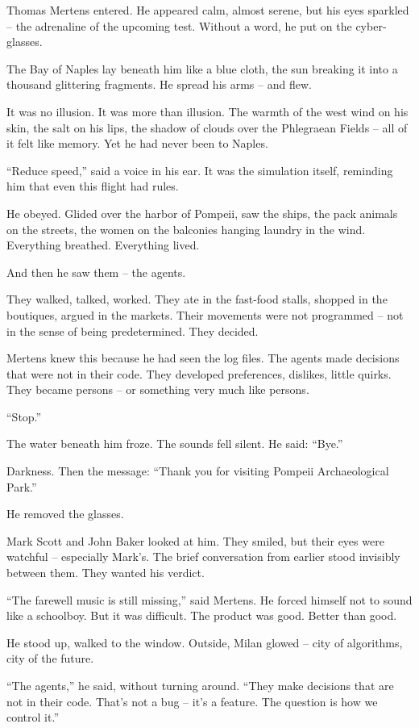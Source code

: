 \documentclass[
]{article}
\begin{document}
Thomas Mertens entered. He appeared calm, almost serene, but his eyes sparkled -- the adrenaline of the upcoming test. Without a word, he put on the cyber-glasses.

The Bay of Naples lay beneath him like a blue cloth, the sun breaking it into a thousand glittering fragments. He spread his arms -- and flew.

It was no illusion. It was more than illusion. The warmth of the west wind on his skin, the salt on his lips, the shadow of clouds over the Phlegraean Fields -- all of it felt like memory. Yet he had never been to Naples.

\enquote{Reduce speed,} said a voice in his ear. It was the simulation itself, reminding him that even this flight had rules.

He obeyed. Glided over the harbor of Pompeii, saw the ships, the pack animals on the streets, the women on the balconies hanging laundry in the wind. Everything breathed. Everything lived.

And then he saw them -- the agents.

They walked, talked, worked. They ate in the fast-food stalls, shopped in the boutiques, argued in the markets. Their movements were not programmed -- not in the sense of being predetermined. They decided.

Mertens knew this because he had seen the log files. The agents made decisions that were not in their code. They developed preferences, dislikes, little quirks. They became persons -- or something very much like persons.

\enquote{Stop.}

The water beneath him froze. The sounds fell silent. He said: \enquote{Bye.}

Darkness. Then the message: \enquote{Thank you for visiting Pompeii Archaeological Park.}

He removed the glasses.

Mark Scott and John Baker looked at him. They smiled, but their eyes were watchful -- especially Mark's. The brief conversation from earlier stood invisibly between them. They wanted his verdict.

\enquote{The farewell music is still missing,} said Mertens. He forced himself not to sound like a schoolboy. But it was difficult. The product was good. Better than good.

He stood up, walked to the window. Outside, Milan glowed -- city of algorithms, city of the future.

\enquote{The agents,} he said, without turning around. \enquote{They make decisions that are not in their code. That's not a bug -- it's a feature. The question is how we control it.}
\end{document}
